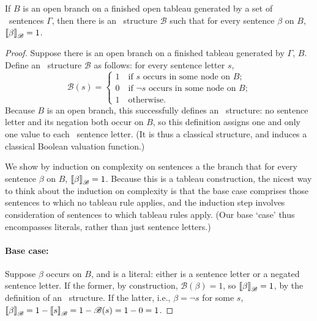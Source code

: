\begin{lemma}\label{lemm:hin} If $B$ is an open branch on a finished
    open tableau generated by a set of \lone\ sentences $\Gamma$, then there is an \lone\ structure $\mathcal{B}$ such that for every sentence $\beta$ on $B$, $\left\llbracket \beta\right\rrbracket_{\mathscr{B}} = 1$.\end{lemma}
\begin{proof}
	
	Suppose there is an open branch on a finished tableau generated by $\Gamma$, $B$. Define an \lone\ structure $\mathscr{B}$ as follows: for every sentence letter $s$, \[\mathscr{B}(s) = \begin{cases}
		1 \quad\text{if $s$ occurs in some node on $B$;}\\
		0 \quad\text{if $\neg s$ occurs in some node on $B$;}\\
		1 \quad\text{otherwise.}
	\end{cases}\] Because $B$ is an open branch, this successfully defines an \lone\ structure: no sentence letter and its negation both occur on $B$, so this definition assigns one and only one value to each \lone\ sentence letter. (It is thus a classical structure, and induces a classical Boolean valuation function.)
	
We show by induction on complexity on sentences a the branch that  for every sentence $\beta$ on $B$, $\left\llbracket \beta\right\rrbracket_{\mathscr{B}}=1$. Because this is a tableau construction, the nicest way to think about the induction on complexity is that the base case comprises those sentences to which no tableau rule applies, and the induction step involves consideration of sentences to which tableau rules apply. (Our base ‘case’ thus encompasses literals, rather than just sentence letters.) 

\paragraph{Base case:} Suppose $\beta$ occurs on $B$, and is a literal: either is a sentence letter or a negated sentence letter. If the former, by construction, $\mathscr{B}(\beta)=1$, so $\left\llbracket \beta\right\rrbracket_{\mathscr{B}}=1$, by the definition of an \lone\ structure. If the latter, i.e., $\beta = \neg s$ for some $s$, $\left\llbracket \beta\right\rrbracket_{\mathscr{B}} = 1 - \left\llbracket s\right\rrbracket_{\mathscr{B}} = 1-\mathscr{B}(s) = 1-0=1$.


\end{proof}
